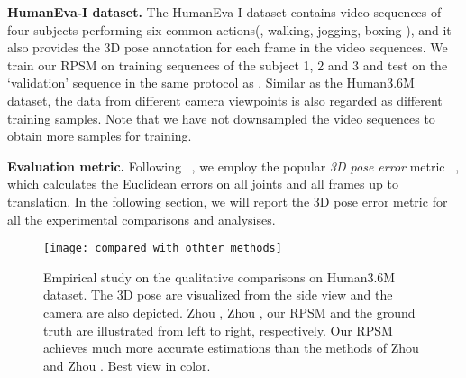 \documentclass[10pt,twocolumn,letterpaper]{article}
\begin{document}
\textbf{HumanEva-I dataset.} The HumanEva-I dataset contains video sequences of four subjects performing six common actions(\eg, walking, jogging, boxing \etc), and it also provides the 3D pose annotation for each frame in the video sequences. We train our RPSM on training sequences of the subject 1, 2 and 3 and test on the `validation' sequence in the same protocol as \cite{yasin2016dual,Tekin_2016_CVPR,simo2012single,SimoSerraCVPR2013,BMVC2880,bo2010twin,radwan2013monocular,wang2014robust}. 
Similar as the Human3.6M dataset, the data from different camera viewpoints is also regarded as different training samples. Note that we have not downsampled the video sequences to obtain more samples for training.

\textbf{Evaluation metric.} Following ~\cite{zhou2015sparseness,DBLP:conf/eccv/DuWLHGWKG16,Tekin_2016_CVPR}, we employ the popular \emph{3D pose error} metric~\cite{simo2012single} , which calculates the Euclidean errors on all joints and all frames up to translation. In the following section, we will report the 3D pose error metric for all the experimental comparisons and analysises. 



\begin{figure*}
\center
\texttt{[image: compared\_with\_othter\_methods]}
\vspace{-5pt}
	\caption{Empirical study on the qualitative comparisons on Human3.6M dataset. The 3D pose are visualized from the side view and the camera are also depicted. Zhou \etal \cite{zhou2015sparseness}, Zhou \etal \cite{zhou2016deep}, our RPSM and the ground truth are illustrated from left to right, respectively. Our RPSM achieves much more accurate estimations than the methods of Zhou \etal \cite{zhou2015sparseness} and Zhou \etal \cite{zhou2016deep}. Best view in color.}
	\vspace{-8pt}
	\label{fig:h3m_vis}
\end{figure*}
\end{document}
